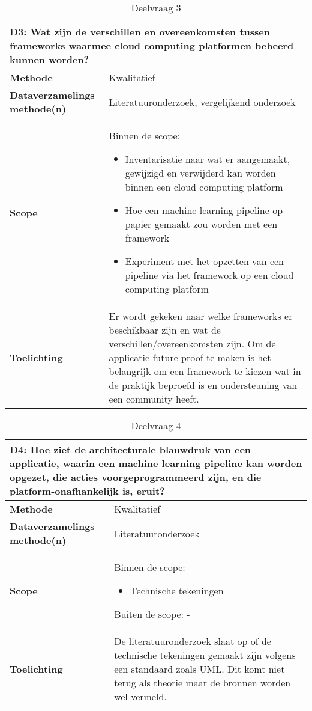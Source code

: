 \begin{table}[hbt!]
\centering
\begin{tabular}{|p{.215\linewidth}|p{.72\linewidth}|}
\hline
\multicolumn{2}{|p{.97\linewidth}|}{\textbf{D3: Wat zijn de verschillen en overeenkomsten tussen frameworks waarmee cloud computing platformen beheerd kunnen worden?}} \\ \hline
  \textbf{Methode}&
    Kwalitatief
  \\ \hline
  \textbf{Dataverzamelings methode(n)}&
    Literatuuronderzoek, vergelijkend onderzoek
  \\ \hline
  \textbf{Scope}&
    Binnen de scope:
    \begin{itemize}
      \item Inventarisatie naar wat er aangemaakt, gewijzigd en verwijderd kan worden binnen een cloud computing platform
      \item Hoe een machine learning pipeline op papier gemaakt zou worden met een framework
      \item Experiment met het opzetten van een pipeline via het framework op een cloud computing platform
    \end{itemize}
  \\ \hline
  \textbf{Toelichting}&
  Er wordt gekeken naar welke frameworks er beschikbaar zijn en wat de verschillen/overeenkomsten zijn. Om de applicatie future proof te maken is het belangrijk om een framework te kiezen wat in de praktijk beproefd is en ondersteuning van een community heeft.
  \\ \hline
\end{tabular}
\caption{Deelvraag 3}
\label{table:sq3}
\end{table}

\space
\newpage

\begin{table}[hbt!]
\centering
\begin{tabular}{|p{.215\linewidth}|p{.72\linewidth}|}
\hline
\multicolumn{2}{|p{.97\linewidth}|}{\textbf{D4: Hoe ziet de architecturale blauwdruk van een applicatie, waarin een machine learning pipeline kan worden opgezet, die acties voorgeprogrammeerd zijn, en die platform-onafhankelijk is, eruit?}} \\ \hline
  \textbf{Methode}&
    Kwalitatief
  \\ \hline
  \textbf{Dataverzamelings methode(n)}&
    Literatuuronderzoek
  \\ \hline
  \textbf{Scope}&
    Binnen de scope:
    \begin{itemize}
      \item Technische tekeningen
    \end{itemize}
    Buiten de scope:
    -
  \\ \hline
  \textbf{Toelichting}&
    De literatuuronderzoek slaat op of de technische tekeningen gemaakt zijn volgens een standaard zoals UML. Dit komt niet terug als theorie maar de bronnen worden wel vermeld.
  \\ \hline
\end{tabular}
\caption{Deelvraag 4}
\label{table:sq4}
\end{table}

